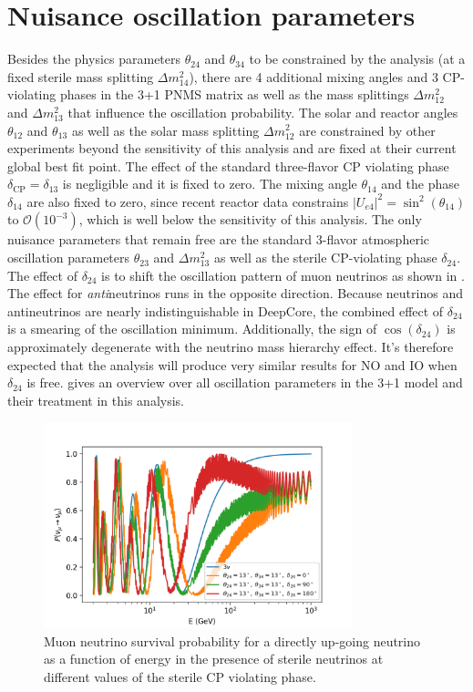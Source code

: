 \section{Nuisance oscillation parameters}
Besides the physics parameters $\theta_{24}$ and $\theta_{34}$ to be constrained by the analysis (at a fixed sterile mass splitting $\Delta m^2_{14}$), there are 4 additional mixing angles and 3 CP-violating phases in the 3+1 PNMS matrix as well as the mass splittings $\Delta m^2_{12}$ and $\Delta m^2_{13}$ that influence the oscillation probability. The solar and reactor angles $\theta_{12}$ and $\theta_{13}$ as well as the solar mass splitting $\Delta m^2_{12}$ are constrained by other experiments beyond the sensitivity of this analysis and are fixed at their current global best fit point. The effect of the standard three-flavor CP violating phase $\delta_{\mathrm{CP}}=\delta_{13}$ is negligible and it is fixed to zero. The mixing angle $\theta_{14}$ and the phase $\delta_{14}$ are also fixed to zero, since recent reactor data constrains $|U_{e4}|^2 = \sin^2(\theta_{14})$ to $\mathcal{O}(10^{-3})$, which is well below the sensitivity of this analysis. The only nuisance parameters that remain free are the standard 3-flavor atmospheric oscillation parameters $\theta_{23}$ and $\Delta m^2_{13}$ as well as the sterile CP-violating phase $\delta_{24}$. The effect of $\delta_{24}$ is to shift the oscillation pattern of muon neutrinos as shown in . The effect for \emph{anti}neutrinos runs in the opposite direction. Because neutrinos and antineutrinos are nearly indistinguishable in DeepCore, the combined effect of $\delta_{24}$ is a smearing of the oscillation minimum. Additionally, the sign of $\cos(\delta_{24})$ is approximately degenerate with the neutrino mass hierarchy effect. It's therefore expected that the analysis will produce very similar results for NO and IO when $\delta_{24}$ is free.  gives an overview over all oscillation parameters in the 3+1 model and their treatment in this analysis.
\begin{figure}
    \centering
    \includegraphics[width=0.8\textwidth]{figures/measurement/sterile_analysis/physics/Muon_neutrino_survival_probability_with_steriles_1D.png}
    \caption{Muon neutrino survival probability for a directly up-going neutrino as a function of energy in the presence of sterile neutrinos at different values of the sterile CP violating phase.}
    \label{fig:sterile-cp-phase-effect}
\end{figure}

